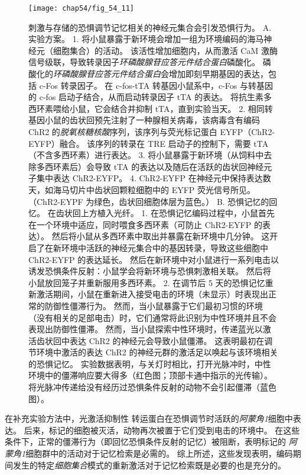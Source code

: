\begin{figure}[htbp]
	\centering
	\texttt{[image: chap54/fig\_54\_11]}
	\caption{刺激与存储的恐惧调节记忆相关的神经元集合会引发恐惧行为\cite{liu2012optogenetic}。
		A. 实验方案。
		1. 将小鼠暴露于新环境会增加一组为环境编码的海马神经元（细胞集合）的活动。
		该活性增加细胞内，从而激活 CaM 激酶信号级联，导致转录因子\textit{环磷酸腺苷应答元件结合蛋白}磷酸化。
		磷酸化的\textit{环磷酸腺苷应答元件结合蛋白}会增加即刻早期基因的表达，包括 c-Fos 转录因子。
		在 c-fos-tTA 转基因小鼠系中，c-Fos 与转基因的 c-fos 启动子结合，从而启动转录因子 tTA 的表达。
		将抗生素多西环素喂给小鼠，它会结合并抑制 tTA，直到实验当天。
		2. 相同转基因小鼠的齿状回预先注射了一种腺相关病毒，该病毒含有编码 ChR2 的\textit{脱氧核糖核酸}序列，该序列与荧光标记蛋白 EYFP（ChR2-EYFP）融合。
		该序列的转录在 TRE 启动子的控制下，需要 tTA（不含多西环素）进行表达。
		3. 将小鼠暴露于新环境（从饲料中去除多西环素后）会导致 tTA 的表达以及随后在活跃的齿状回神经元子集中表达 ChR2-EYFP。
		4. ChR2-EYFP 在神经元中保持表达数天，如海马切片中齿状回颗粒细胞中的 EYFP 荧光信号所见。
		（ChR2-EYPF 为绿色，齿状回细胞体层为蓝色。） 
		B. 恐惧记忆的回忆。
		在齿状回上方植入光纤。
		1. 在恐惧记忆编码过程中，小鼠首先在一个环境中适应，同时喂食多西环素（可防止 ChR2-EYFP 的表达）。
		然后将小鼠从多西环素中取出并暴露在新环境中几分钟。
		这开启了在新环境中活跃的神经元集合中的基因转录，导致这些细胞中 ChR2-EYFP 的表达延长。
		然后在新环境中对小鼠进行一系列电击以诱发恐惧条件反射：小鼠学会将新环境与恐惧刺激相关联。
		然后将小鼠放回笼子并重新服用多西环素。
		2. 在调节后 5 天的恐惧记忆重新激活期间，小鼠在重新进入接受电击的环境（未显示）时表现出正常的防御性僵滞行为。
		然而，当小鼠暴露于它们最初习惯的环境（没有相关的足部电击）时，它们通常将此识别为中性环境并且不会表现出防御性僵滞。
		然而，当小鼠探索中性环境时，传递蓝光以激活齿状回中表达 ChR2 的神经元会导致小鼠僵滞。
		这表明最初在调节环境中激活的表达 ChR2 的神经元群的激活足以唤起与该环境相关的恐惧记忆。
		实验数据表明，与关灯时相比，打开光脉冲时，中性环境中的僵滞响应要大得多（红色图；顶部卡通中指示的光传输）。
		将光脉冲传递给没有经历过恐惧条件反射的动物不会引起僵滞（蓝色图）。}
	\label{fig:54_11}
\end{figure}


在补充实验方法中，光激活抑制性  转运蛋白在恐惧调节时活跃的\textit{阿蒙角1}细胞中表达。
后来，标记的细胞被灭活，动物再次被置于它们受到电击的环境中。
在这些条件下，正常的僵滞行为（即回忆恐惧条件反射的记忆）被阻断，表明标记的 \textit{阿蒙角1}细胞群中的活动对于记忆检索是必需的。
综上所述，这些发现表明，编码期间发生的特定\textit{细胞集合}模式的重新激活对于记忆检索既是必要的也是充分的。



